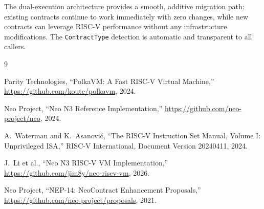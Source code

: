 \documentclass[11pt,a4paper]{article}
\begin{document}
The dual-execution architecture provides a smooth, additive migration path:
existing contracts continue to work immediately with zero changes, while new
contracts can leverage RISC-V performance without any infrastructure
modifications. The \texttt{ContractType} detection is automatic and
transparent to all callers.

\begin{thebibliography}{9}

    Parity Technologies,
    ``PolkaVM: A Fast RISC-V Virtual Machine,''
    \url{https://github.com/koute/polkavm}, 2024.

    Neo Project,
    ``Neo N3 Reference Implementation,''
    \url{https://github.com/neo-project/neo}, 2024.

    A.~Waterman and K.~Asanovi{\'c},
    ``The RISC-V Instruction Set Manual, Volume I: Unprivileged ISA,''
    RISC-V International, Document Version 20240411, 2024.

    J.~Li et al.,
    ``Neo N3 RISC-V VM Implementation,''
    \url{https://github.com/jim8y/neo-riscv-vm}, 2026.

    Neo Project,
    ``NEP-14: NeoContract Enhancement Proposals,''
    \url{https://github.com/neo-project/proposals}, 2021.

\end{thebibliography}
\end{document}
